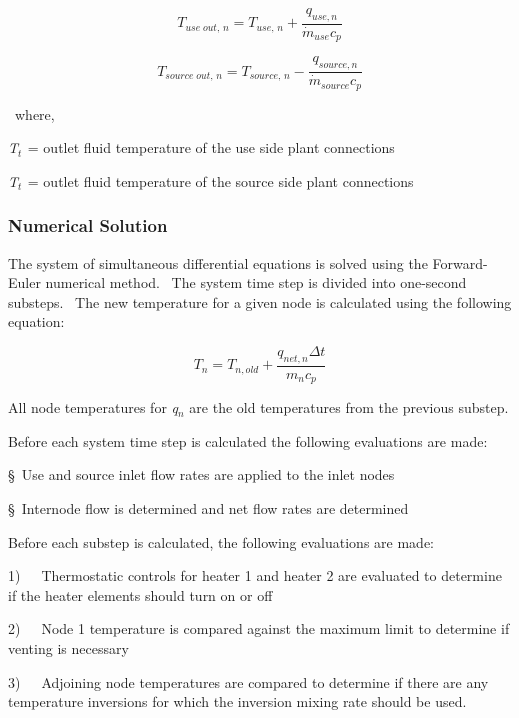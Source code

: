 \begin{equation}
{T_{use\;out,\,n}} = {T_{use,\,n}} + \frac{{{q_{use,n}}}}{{{{\dot m}_{use}}{c_p}}}
\end{equation}

\begin{equation}
{T_{source\;out,\,n}} = {T_{source,\,n}} - \frac{{{q_{source,n}}}}{{{{\dot m}_{source}}{c_p}}}
\end{equation}

~where,

\emph{T\(_{t}\)}\(_{ }\) = outlet fluid temperature of the use side plant connections

\emph{T\(_{t}\)}\(_{ }\) = outlet fluid temperature of the source side plant connections

\subsubsection{Numerical Solution}\label{numerical-solution}

The system of simultaneous differential equations is solved using the Forward-Euler numerical method.~ The system time step is divided into one-second substeps.~ The new temperature for a given node is calculated using the following equation:

\begin{equation}
{T_n} = {T_{n,old}} + \frac{{{q_{net,n}}\Delta t}}{{{m_n}{c_p}}}
\end{equation}

All node temperatures for \emph{q\(_{n}\)} are the old temperatures from the previous substep.

Before each system time step is calculated the following evaluations are made:

§~Use and source inlet flow rates are applied to the inlet nodes

§~Internode flow is determined and net flow rates are determined

Before each substep is calculated, the following evaluations are made:

1)~~~Thermostatic controls for heater 1 and heater 2 are evaluated to determine if the heater elements should turn on or off

2)~~~Node 1 temperature is compared against the maximum limit to determine if venting is necessary

3)~~~Adjoining node temperatures are compared to determine if there are any temperature inversions for which the inversion mixing rate should be used.

